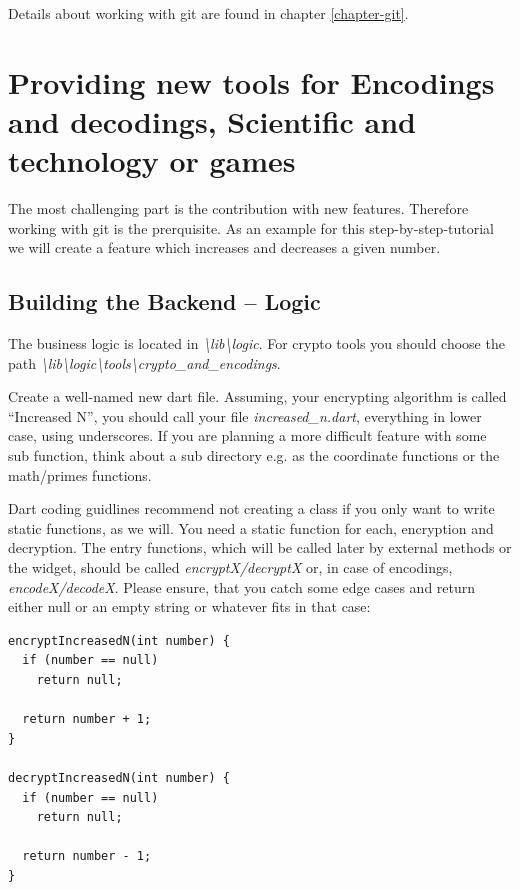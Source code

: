 Details about working with git are found in chapter \ref{chapter-git}. 

\section{Providing new tools for Encodings and decodings, Scientific and technology or games}
The most challenging part is the contribution with new features. Therefore working with git is the prerquisite. As an example for this step-by-step-tutorial we will create a feature which increases and decreases a given number.

\subsection{Building the Backend -- Logic}
The business logic is located in \emph{\textbackslash lib\textbackslash logic}. For crypto tools you should choose the path \emph{\textbackslash lib\textbackslash logic\textbackslash tools\textbackslash crypto\_and\_encodings}.\par 

Create a well-named new dart file. Assuming, your encrypting algorithm is called \enquote{Increased N}, you should call your file \emph{increased\_n.dart}, everything in lower case, using underscores. If you are planning a more difficult feature with some sub function, think about a sub directory e.g. as the coordinate functions or the math/primes functions. \par

Dart coding guidlines recommend not creating a class if you only want to write static functions, as we will. You need a static function for each, encryption and decryption. The entry functions, which will be called later by external methods or the widget, should be called \emph{encryptX/decryptX} or, in case of encodings, \emph{encodeX/decodeX}. Please ensure, that you catch some edge cases and return either null or an empty string or whatever fits in that case:

\begin{lstlisting}
encryptIncreasedN(int number) {
  if (number == null)
    return null;

  return number + 1;
}

decryptIncreasedN(int number) {
  if (number == null)
    return null;

  return number - 1;
}
\end{lstlisting}
\label{fig: logic}

